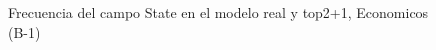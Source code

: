 \begin{figure}[H]
    \centering
    
    \caption{Frecuencia del campo State en el modelo real y top2+1, Economicos (B-1)}
    \label{frecuency-State-top2+1}
\end{figure}